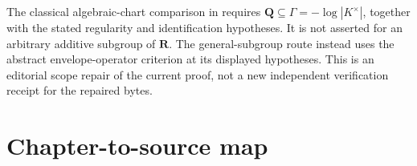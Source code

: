 \begin{remark}
\label{rem:appL-polyhedral-comparison-boundary}
The classical algebraic-chart comparison in
 requires
\(\mathbf Q\subseteq\Gamma=-\log|K^\times|\), together with the
stated regularity and identification hypotheses. It is not asserted for an arbitrary additive
subgroup of \(\mathbf R\). The general-subgroup route instead uses the
abstract envelope-operator criterion at its displayed hypotheses. This is
an editorial scope repair of the current proof, not a new independent
verification receipt for the repaired bytes.
\end{remark}

\section{Chapter-to-source map}
\label{sec:appL-chapter-map}

